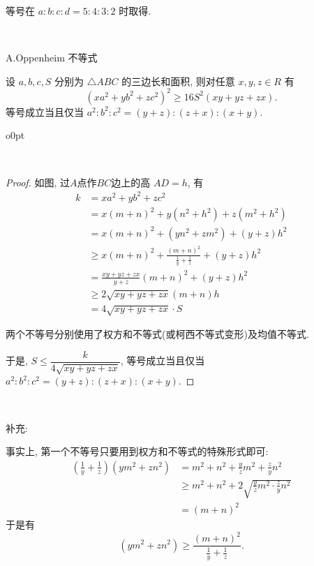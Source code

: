 等号在 $a:b:c:d=5:4:3:2$ 时取得.

~
\newpage

\noindent A.Oppenheim 不等式

设 $a,b,c,S$ 分别为 $\triangle ABC$ 的三边长和面积, 则对任意 $x,y,z\in R$ 有
\[(xa^2+yb^2+zc^2)^2 \ge 16S^2(xy+yz+zx) .\]
等号成立当且仅当 $a^2:b^2:c^2=(y+z):(z+x):(x+y)$.

\begin{wrapfigure}[4]{o}{0pt}
\end{wrapfigure}
~

\begin{proof}
如图, 过$A$点作$BC$边上的高 $AD=h$, 有
\begin{align*}
 k&=xa^2+yb^2+zc^2\\
&=x(m+n)^2+y(n^2+h^2)+z(m^2+h^2)\\
&=x(m+n)^2+(yn^2+zm^2)+(y+z)h^2\\
&\ge x(m+n)^2+\frac{(m+n)^2}{\frac{1}{y}+\frac{1}{z}}+(y+z)h^2\\
&= \frac{xy+yz+zx}{y+z}(m+n)^2+(y+z)h^2\\
&\ge 2\sqrt{xy+yz+zx}(m+n)h\\
&=4\sqrt{xy+yz+zx}\cdot S
\end{align*}

两个不等号分别使用了权方和不等式(或柯西不等式变形)及均值不等式.

于是, $S\le \dfrac{k}{4\sqrt{xy+yz+zx}}$, 等号成立当且仅当 $a^2:b^2:c^2=(y+z):(z+x):(x+y)$.
\end{proof}

~

\noindent 补充:

事实上, 第一个不等号只要用到权方和不等式的特殊形式即可: 
\begin{align*}
\left(\frac{1}{y}+\frac{1}{z}\right)(ym^2+zn^2) &= m^2 + n^2 + \frac{y}{z}m^2 + \frac{z}{y}n^2\\
&\ge m^2+n^2 + 2\sqrt{\frac{y}{z}m^2\cdot\frac{z}{y}n^2}\\
&=(m+n)^2
\end{align*}
于是有 
\[
(ym^2+zn^2) \ge \frac{(m+n)^2}{\frac{1}{y}+\frac{1}{z}}.
\]

